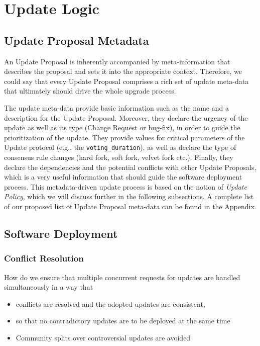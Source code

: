 \section{Update Logic}
\subsection*{Update Proposal Metadata} 
An Update Proposal is inherently accompanied by meta-information that describes the proposal and sets it into the appropriate context. Therefore, we could say that every Update Proposal comprises a rich set of update meta-data that ultimately should drive the whole upgrade process.

The update meta-data provide basic information such as the name and a description for the Update Proposal. Moreover, they declare the urgency of the update as well as its type (Change Request or bug-fix), in order to guide the prioritization of the update. They provide values for critical parameters of the Update protocol (e.g., the \verb;voting_duration;), as well as declare the type of consensus rule changes (hard fork, soft fork, velvet fork etc.). Finally, they declare the dependencies and the potential conflicts with other Update Proposals, which is a very useful information that should guide the software deployment process. This metadata-driven update process is  based on the notion of \emph{Update Policy}, which we will discuss further in the following subsections.
A complete list of our proposed list of Update Proposal meta-data can be found in the Appendix. 



\subsection*{Software Deployment}
\subsubsection*{Conflict Resolution}
How do we ensure that multiple concurrent requests for updates are handled simultaneously in a way that
\begin{itemize}
\item conflicts are resolved and the adopted updates are consistent, 
\item so that no contradictory updates are to be deployed at the same time
\item Community splits over controversial updates are avoided
\end{itemize}

